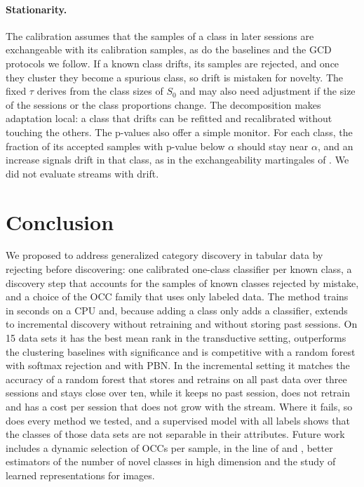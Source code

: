 \documentclass[pdflatex,sn-basic]{sn-jnl}
\begin{document}
\paragraph{Stationarity.} The calibration assumes that the samples of a class in later sessions are exchangeable with its calibration samples, as do the baselines and the GCD protocols we follow. If a known class drifts, its samples are rejected, and once they cluster they become a spurious class, so drift is mistaken for novelty. The fixed $\tau$ derives from the class sizes of $S_0$ and may also need adjustment if the size of the sessions or the class proportions change. The decomposition makes adaptation local: a class that drifts can be refitted and recalibrated without touching the others. The p-values also offer a simple monitor. For each class, the fraction of its accepted samples with p-value below $\alpha$ should stay near $\alpha$, and an increase signals drift in that class, as in the exchangeability martingales of \citet{vovk2003testing}. We did not evaluate streams with drift.

\section{Conclusion}\label{sec:conclusion}

We proposed to address generalized category discovery in tabular data by rejecting before discovering: one calibrated one-class classifier per known class, a discovery step that accounts for the samples of known classes rejected by mistake, and a choice of the OCC family that uses only labeled data. The method trains in seconds on a CPU and, because adding a class only adds a classifier, extends to incremental discovery without retraining and without storing past sessions. On 15 data sets it has the best mean rank in the transductive setting, outperforms the clustering baselines with significance and is competitive with a random forest with softmax rejection and with PBN. In the incremental setting it matches the accuracy of a random forest that stores and retrains on all past data over three sessions and stays close over ten, while it keeps no past session, does not retrain and has a cost per session that does not grow with the stream. Where it fails, so does every method we tested, and a supervised model with all labels shows that the classes of those data sets are not separable in their attributes. Future work includes a dynamic selection of OCCs per sample, in the line of \citet{krawczyk2016dcs} and \citet{fragoso2021modes}, better estimators of the number of novel classes in high dimension and the study of learned representations for images.
\end{document}

